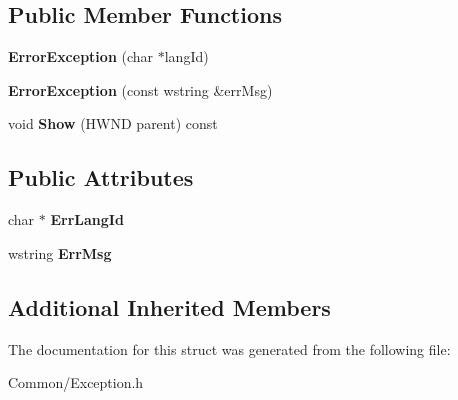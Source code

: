 \subsection*{Public Member Functions}
\begin{DoxyCompactItemize}
\item 
\mbox{\label{struct_gost_crypt_1_1_error_exception_a66ea4ace9859fa918334e562f8b25771}} 
{\bfseries Error\+Exception} (char $\ast$lang\+Id)
\item 
\mbox{\label{struct_gost_crypt_1_1_error_exception_aa675f5ddaac3c234d15a3fb1bdc2bc6a}} 
{\bfseries Error\+Exception} (const wstring \&err\+Msg)
\item 
\mbox{\label{struct_gost_crypt_1_1_error_exception_ad2e5c5e44beb662ea7473113a889103b}} 
void {\bfseries Show} (H\+W\+ND parent) const
\end{DoxyCompactItemize}
\subsection*{Public Attributes}
\begin{DoxyCompactItemize}
\item 
\mbox{\label{struct_gost_crypt_1_1_error_exception_aaf341f9e63abc7297fabe942b3f08358}} 
char $\ast$ {\bfseries Err\+Lang\+Id}
\item 
\mbox{\label{struct_gost_crypt_1_1_error_exception_a8f896752cc133e7e8452ce10132e0c4b}} 
wstring {\bfseries Err\+Msg}
\end{DoxyCompactItemize}
\subsection*{Additional Inherited Members}


The documentation for this struct was generated from the following file\+:\begin{DoxyCompactItemize}
\item 
Common/Exception.\+h\end{DoxyCompactItemize}
